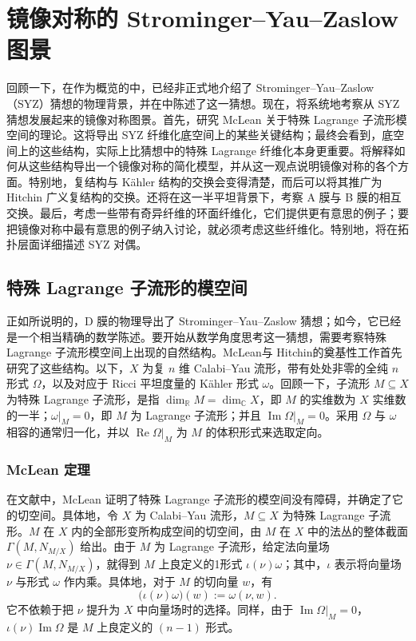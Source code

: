\chapter{镜像对称的 Strominger--Yau--Zaslow 图景}\label{chap:6}

回顾一下，在作为概览的中，已经非正式地介绍了 Strominger--Yau--Zaslow（SYZ）猜想的物理背景，并在中陈述了这一猜想。现在，将系统地考察从 SYZ 猜想发展起来的镜像对称图景。首先，研究 McLean 关于特殊 Lagrange 子流形模空间的理论。这将导出 SYZ 纤维化底空间上的某些关键结构；最终会看到，底空间上的这些结构，实际上比猜想中的特殊 Lagrange 纤维化本身更重要。将解释如何从这些结构导出一个镜像对称的简化模型，并从这一观点说明镜像对称的各个方面。特别地，复结构与 Kähler 结构的交换会变得清楚，而后可以将其推广为 Hitchin 广义复结构的交换。还将在这一半平坦背景下，考察 A 膜与 B 膜的相互交换。最后，考虑一些带有奇异纤维的环面纤维化，它们提供更有意思的例子；要把镜像对称中最有意思的例子纳入讨论，就必须考虑这些纤维化。特别地，将在拓扑层面详细描述 SYZ 对偶。

\section{特殊 Lagrange 子流形的模空间}\label{sec:6.1}

正如所说明的，D 膜的物理导出了 Strominger--Yau--Zaslow 猜想；如今，它已经是一个相当精确的数学陈述。要开始从数学角度思考这一猜想，需要考察特殊 Lagrange 子流形模空间上出现的自然结构。McLean与 Hitchin的奠基性工作首先研究了这些结构。以下，$X$ 为复 $n$ 维 Calabi--Yau 流形，带有处处非零的全纯 $n$ 形式 $\Omega$，以及对应于 Ricci 平坦度量的 Kähler 形式 $\omega$。回顾一下，子流形 $M\subseteq X$ 为特殊 Lagrange 子流形，是指 $\dim_{\mathbb R}M=\dim_{\mathbb C}X$，即 $M$ 的实维数为 $X$ 实维数的一半；$\omega|_M=0$，即 $M$ 为 Lagrange 子流形；并且 $\operatorname{Im}\Omega|_M=0$。采用 $\Omega$ 与 $\omega$ 相容的通常归一化，并以 $\operatorname{Re}\Omega|_M$ 为 $M$ 的体积形式来选取定向。

\subsection{McLean 定理}\label{sec:6.1.1}

在文献中，McLean 证明了特殊 Lagrange 子流形的模空间没有障碍，并确定了它的切空间。具体地，令 $X$ 为 Calabi--Yau 流形，$M\subseteq X$ 为特殊 Lagrange 子流形。$M$ 在 $X$ 内的全部形变所构成空间的切空间，由 $M$ 在 $X$ 中的法丛的整体截面 $\Gamma(M,N_{M/X})$ 给出。由于 $M$ 为 Lagrange 子流形，给定法向量场 $\nu\in\Gamma(M,N_{M/X})$，就得到 $M$ 上良定义的1形式 $\iota(\nu)\omega$；其中，$\iota$ 表示将向量场 $\nu$ 与形式 $\omega$ 作内乘。具体地，对于 $M$ 的切向量 $w$，有
\[
\bigl(\iota(\nu)\omega\bigr)(w):=\omega(\nu,w).
\]
它不依赖于把 $\nu$ 提升为 $X$ 中向量场时的选择。同样，由于 $\operatorname{Im}\Omega|_M=0$，$\iota(\nu)\operatorname{Im}\Omega$ 是 $M$ 上良定义的 $(n-1)$ 形式。


